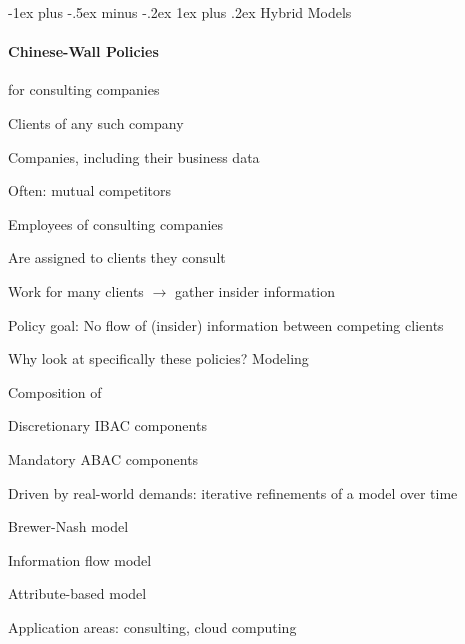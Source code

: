 \documentclass[a4paper]{article}
\makeatletter
\renewcommand{\subsubsection}{\@startsection{subsubsection}{3}{0mm}%
                                {-1ex plus -.5ex minus -.2ex}%
                                {1ex plus .2ex}%
                                {\normalfont\small\bfseries}}
\makeatother
\begin{document}
\begin{multicols}{3}
    \subsubsection{Hybrid Models}
    \paragraph{Chinese-Wall Policies}
    for consulting companies
    \begin{itemize*}
        \item Clients of any such company
        \begin{itemize*}
            \item Companies, including their business data
            \item Often: mutual competitors
        \end{itemize*}
        \item Employees of consulting companies
        \begin{itemize*}
            \item Are assigned to clients they consult
            \item Work for many clients $\rightarrow$ gather insider information
        \end{itemize*}
        \item Policy goal: No flow of (insider) information between competing clients
    \end{itemize*}

    Why look at specifically these policies? Modeling
    \begin{itemize*}
        \item Composition of
        \begin{itemize*}
            \item Discretionary IBAC components
            \item Mandatory ABAC components
        \end{itemize*}
        \item Driven by real-world demands: iterative refinements of a model over time
        \begin{itemize*}
            \item Brewer-Nash model
            \item Information flow model
            \item Attribute-based model
        \end{itemize*}
        \item Application areas: consulting, cloud computing
    \end{itemize*}


\end{multicols}
\end{document}
